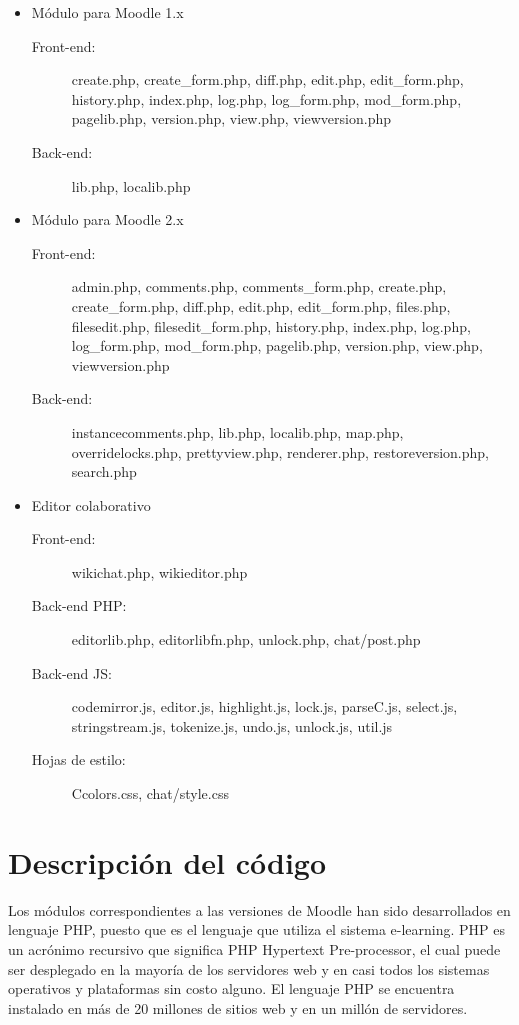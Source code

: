 \begin{itemize}
	\renewcommand{\labelitemi}{$\bullet$}
	\item Módulo para Moodle 1.x
	\begin{description}
		\item[Front-end:] create.php, create\_form.php, diff.php, edit.php, edit\_form.php, history.php, index.php, log.php, log\_form.php, mod\_form.php, pagelib.php, version.php, view.php, viewversion.php
		\item[Back-end:] lib.php, localib.php
	\end{description}
	\newpage
	\item Módulo para Moodle 2.x
	\begin{description}
		\item[Front-end:] admin.php, comments.php, comments\_form.php, create.php, create\_form.php, diff.php, edit.php, edit\_form.php, files.php, filesedit.php, filesedit\_form.php, history.php, index.php, log.php, log\_form.php, mod\_form.php, pagelib.php, version.php, view.php, viewversion.php
		\item[Back-end:] instancecomments.php, lib.php, localib.php, map.php, overridelocks.php, prettyview.php, renderer.php, restoreversion.php, search.php
	\end{description}
	\item Editor colaborativo
	\begin{description}
		\item[Front-end:] wikichat.php, wikieditor.php 
		\item[Back-end PHP:] editorlib.php, editorlibfn.php, unlock.php, chat/post.php
		\item[Back-end JS:] codemirror.js, editor.js, highlight.js, lock.js, parseC.js, select.js, stringstream.js, tokenize.js, undo.js, unlock.js, util.js
		\item[Hojas de estilo:] Ccolors.css, chat/style.css
	\end{description}
\end{itemize}

\section{Descripción del código}

Los módulos correspondientes a las versiones de Moodle han sido desarrollados en lenguaje PHP, puesto que es el lenguaje que utiliza el sistema e-learning. PHP es un acrónimo recursivo que significa PHP Hypertext Pre-processor, el cual puede ser desplegado en la mayoría de los servidores web y en casi todos los sistemas operativos y plataformas sin costo alguno. El lenguaje PHP se encuentra instalado en más de 20 millones de sitios web y en un millón de servidores.

